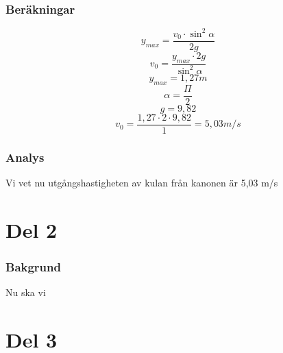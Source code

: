 \documentclass[11p]{article}
\begin{document}
        \subsubsection{Beräkningar}
            \begin{equation}
                y_{max}=\frac{v_0 \cdot \sin^2 \alpha}{2g}
                \label{eq:eq1}
            \end{equation}
            \begin{equation}
                v_0=\frac{y_{max} \cdot 2g}{\sin^2 \alpha}
                \label{eq:eq2}
            \end{equation}
            \begin{equation}
                y_{max}=1,27 m
                \label{eq:eq3}
            \end{equation}
            \begin{equation}
                \alpha=\frac{\Pi}{2}
                \label{eq:eq4}
            \end{equation}
            \begin{equation}
                g=9,82
                \label{eq:eq5}
            \end{equation}
            \begin{equation}
                v_0=\frac{1,27 \cdot 2 \cdot 9,82}{1}=5,03 m/s
                \label{eq:eq6}
            \end{equation}
        \subsubsection{Analys}
            Vi vet nu utgångshastigheten av kulan från kanonen är 5,03 m/s

    \section{Del 2}
        \subsubsection{Bakgrund}
            Nu ska vi 
    \section{Del 3}

\end{document}
